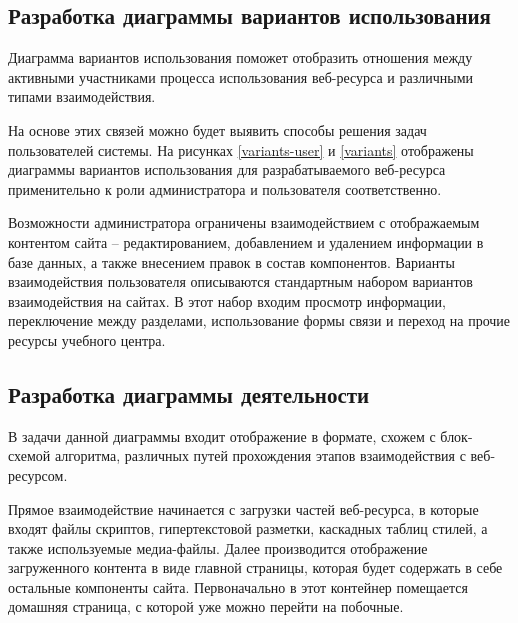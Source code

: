 

\subsection{Разработка диаграммы вариантов использования}

Диаграмма вариантов использования поможет отобразить отношения между активными участниками процесса использования веб-ресурса и различными типами взаимодействия.

На основе этих связей можно будет выявить способы решения задач пользователей системы.
На рисунках \ref{variants-user} и \ref{variants} отображены диаграммы вариантов использования для разрабатываемого веб-ресурса применительно к роли администратора и пользователя соответственно.



Возможности администратора ограничены взаимодействием с отображаемым контентом сайта -- редактированием, добавлением и удалением информации в базе данных, а также внесением правок в состав компонентов.
Варианты взаимодействия пользователя описываются стандартным набором вариантов взаимодействия на сайтах.
В этот набор входим просмотр информации, переключение между разделами, использование формы связи и переход на прочие ресурсы учебного центра.


\subsection{Разработка диаграммы деятельности}

В задачи данной диаграммы входит отображение в формате, схожем с блок-схемой алгоритма, различных путей прохождения этапов взаимодействия с веб-ресурсом.

Прямое взаимодействие начинается с загрузки частей веб-ресурса, в которые входят файлы скриптов, гипертекстовой разметки, каскадных таблиц стилей, а также используемые медиа-файлы.
Далее производится отображение загруженного контента в виде главной страницы, которая будет содержать в себе остальные компоненты сайта.
Первоначально в этот контейнер помещается домашняя страница, с которой уже можно перейти на побочные.

